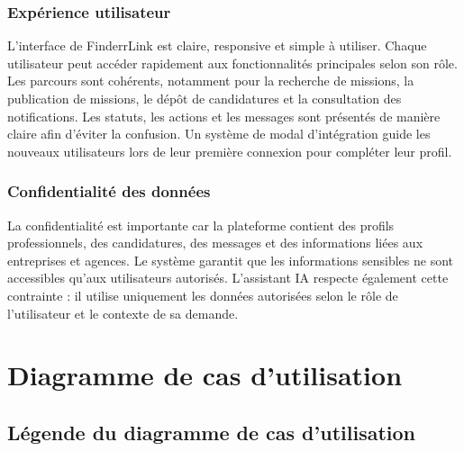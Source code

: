 \subsubsection{Expérience utilisateur}

L'interface de FinderrLink est claire, responsive et simple à utiliser. Chaque utilisateur peut accéder rapidement aux fonctionnalités principales selon son rôle. Les parcours sont cohérents, notamment pour la recherche de missions, la publication de missions, le dépôt de candidatures et la consultation des notifications. Les statuts, les actions et les messages sont présentés de manière claire afin d'éviter la confusion. Un système de modal d'intégration guide les nouveaux utilisateurs lors de leur première connexion pour compléter leur profil.

\subsubsection{Confidentialité des données}

La confidentialité est importante car la plateforme contient des profils professionnels, des candidatures, des messages et des informations liées aux entreprises et agences. Le système garantit que les informations sensibles ne sont accessibles qu'aux utilisateurs autorisés. L'assistant IA respecte également cette contrainte : il utilise uniquement les données autorisées selon le rôle de l'utilisateur et le contexte de sa demande.
\section{Diagramme de cas d'utilisation}

\subsection{Légende du diagramme de cas d'utilisation}

